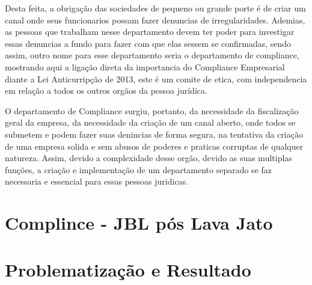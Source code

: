 Desta feita, a obrigação das sociedades de pequeno ou grande porte é de criar um canal onde seus funcionarios possam fazer denuncias de irregularidades. Ademias, as pessoas que trabalham nesse departamento devem ter poder para investigar essas denuncias a fundo para fazer com que elas sessem se confirmadas, sendo assim, outro nome para esse departamento seria o departamento de compliance, mostrando aqui a ligação direta da importancia do Compliance Empresarial diante a Lei Anticurripção de 2013, este é um comite de etica, com independencia em relação a todos os outros orgãos da pessoa jurídica. 

O departamento de Compliance surgiu, portanto, da necessidade da fiscalização geral da empresa, da necessidade da criação de um canal aberto, onde todos se submetem e podem fazer suas denincias de forma segura, na tentativa da criação de uma empresa solida e sem abusos de poderes e praticas corruptas de qualquer natureza. Assim, devido a complexidade desse orgão, devido as suas multiplas funções, a criação e implementação de um departamento separado se faz necessaria e essencial para essas pessoas juridicas. 


\chapter{Complince - JBL pós Lava Jato }



\chapter{Problematização e Resultado}



